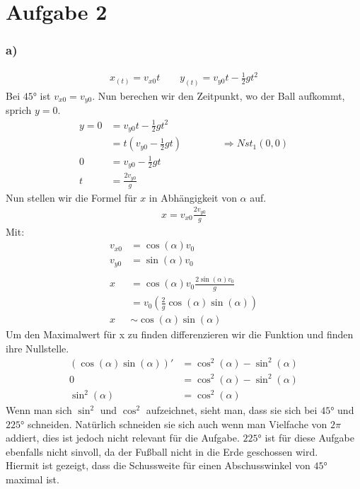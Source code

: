 \documentclass[a4paper,11pt]{article}
\begin{document}
\section*{Aufgabe 2}
  \subsubsection*{a)}
    \begin{align*}
      x_{(t)}=v_{x0}t \qquad y_{(t)}=v_{y0}t-\frac{1}{2}gt^2
    \end{align*}
    Bei $\ang{45}$ ist $v_{x0} = v_{y0}$. Nun berechen wir den Zeitpunkt, wo der Ball aufkommt, sprich $y=0$.
    \begin{align*}
      y=0&=v_{y0}t-\frac{1}{2}gt^2 \\
      &=t(v_{y0}-\frac{1}{2}gt) \qquad \qquad \Rightarrow Nst_1(0,0)\\
      0&=v_{y0}-\frac{1}{2}gt\\
      t&=\frac{2v_{y0}}{g}
    \end{align*}
    Nun stellen wir die Formel für $x$ in Abhängigkeit von $\alpha$ auf.
    \begin{align*}
      x=v_{x0}\frac{2v_{y0}}{g}
    \end{align*}
    Mit:
    \begin{align*}
      v_{x0}&=\cos(\alpha)v_0\\
      v_{y0}&=\sin(\alpha)v_0\\\\
      x&=\cos(\alpha)v_0\frac{2\sin(\alpha)v_0}{g}\\
      &=v_0(\frac{2}{g}\cos(\alpha)\sin(\alpha)) \\
      x&\sim \cos(\alpha)\sin(\alpha)
    \end{align*}
    Um den Maximalwert für x zu finden differenzieren wir die Funktion und finden ihre Nullstelle.
     \begin{align*}
      (\cos(\alpha)\sin(\alpha))\prime &= \cos^2(\alpha)-\sin^2(\alpha)\\
      0&=\cos^2(\alpha)-\sin^2(\alpha)\\
      \sin^2(\alpha)&=\cos^2(\alpha)
    \end{align*}
    Wenn man sich $\sin^2$ und $\cos^2$ aufzeichnet, sieht man, dass sie sich bei $\ang{45}$ und $\ang{225}$ schneiden. Natürlich schneiden sie sich auch wenn man Vielfache von $2\pi$ addiert, dies ist jedoch nicht relevant für die Aufgabe. $\ang{225}$ ist für diese Aufgabe ebenfalls nicht sinvoll, da der Fußball nicht in die Erde geschossen wird. \\
    Hiermit ist gezeigt, dass die Schussweite für einen Abschusswinkel von $\ang{45}$ maximal ist.
\end{document}

